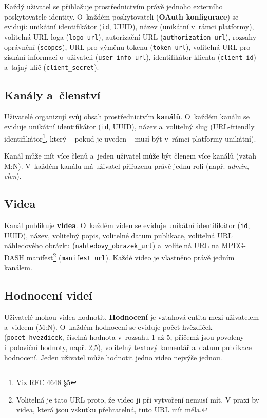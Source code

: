 \documentclass[12pt,a4paper]{article}
\begin{document}
Každý uživatel se přihlašuje prostřednictvím právě jednoho externího poskytovatele identity.
O~každém poskytovateli (\textbf{OAuth konfigurace}) se evidují: unikátní identifikátor
(\texttt{id}, UUID), název (unikátní v~rámci platformy), volitelná URL loga
(\texttt{logo\_url}), autorizační URL (\texttt{authorization\_url}), rozsahy oprávnění
(\texttt{scopes}), URL pro výměnu tokenu (\texttt{token\_url}), volitelná URL pro získání
informací o~uživateli (\texttt{user\_info\_url}), identifikátor klienta (\texttt{client\_id})
a~tajný klíč (\texttt{client\_secret}).

\subsection*{Kanály a~členství}
\label{sec:memberships}

Uživatelé organizují svůj obsah prostřednictvím \textbf{kanálů}. O~každém kanálu se eviduje
unikátní identifikátor (\texttt{id}, UUID), název a~volitelný slug (URL-friendly identifikátor\footnote{Viz \href{https://datatracker.ietf.org/doc/html/rfc4648\#section-5}{RFC 4648 §5}},
který -- pokud je uveden -- musí být v~rámci platformy unikátní).

Kanál může mít více členů a~jeden uživatel může být členem více kanálů (vztah M:N).
V~každém kanálu má uživatel přiřazenu právě jednu roli (např. \emph{admin}, \emph{clen}).

\subsection*{Videa}

Kanál publikuje \textbf{videa}. O~každém videu se eviduje unikátní identifikátor (\texttt{id},
UUID), název, volitelný popis, volitelné datum publikace, volitelná URL náhledového obrázku
(\texttt{nahledovy\_obrazek\_url}) a~volitelná URL na MPEG-DASH manifest\footnote{Volitelná je tato URL proto, že video ji při vytvoření nemusí mít. V praxi by videa, která jsou vskutku přehratelná, tuto URL mít měla.}
(\texttt{manifest\_url}). Každé video je vlastněno právě jedním kanálem.

\subsection*{Hodnocení videí}

Uživatelé mohou videa hodnotit. \textbf{Hodnocení} je vztahová entita mezi uživatelem a~videem
(M:N). O~každém hodnocení se eviduje počet hvězdiček (\texttt{pocet\_hvezdicek}, číselná
hodnota v~rozsahu 1 až 5, přičemž jsou povoleny i~poloviční hodnoty, např. 2,5), volitelný
textový komentář a~datum publikace hodnocení. Jeden uživatel může hodnotit jedno video
nejvýše jednou.
\end{document}
